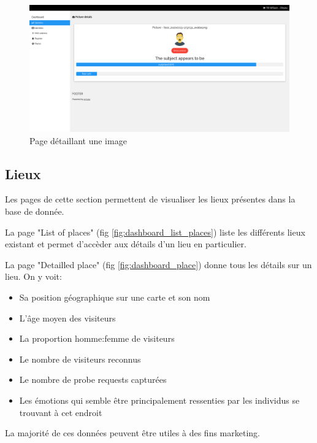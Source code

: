\clearpage
\newpage
\thispagestyle{empty}
\begin{landscape}
    \centering
\thispagestyle{empty}
\begin{figure}[h]
	\includegraphics[width=\linewidth]{images/dashboard/detailled_pictures.png}
	\caption{Page détaillant une image}
	\label{fig:dashboard_picture}
\end{figure}
\end{landscape}

\subsection{Lieux}
Les pages de cette section permettent de visualiser les lieux présentes dans la base de donnée.

La page "List of places" (fig \ref{fig:dashboard_list_places}) liste les différents lieux existant et permet d'accèder aux détails d'un lieu en particulier.

La page "Detailled place" (fig \ref{fig:dashboard_place}) donne tous les détails sur un lieu. On y voit:
\begin{itemize}
    \item Sa position géographique sur une carte et son nom
    \item L'âge moyen des visiteurs
    \item La proportion homme:femme de visiteurs
    \item Le nombre de visiteurs reconnus
    \item Le nombre de probe requests capturées
    \item Les émotions qui semble être principalement ressenties par les individus se trouvant à cet endroit
\end{itemize}

La majorité de ces données peuvent être utiles à des fins marketing.

